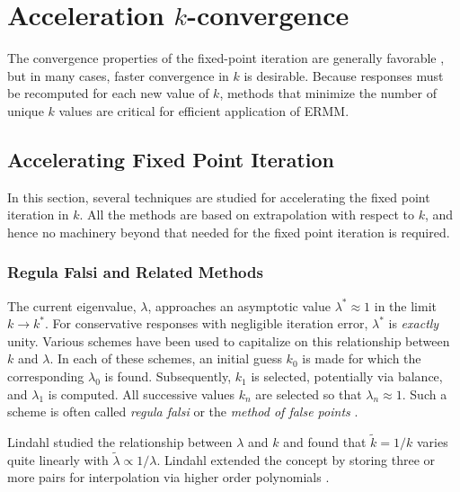 \section{Acceleration $k$-convergence}
\label{sec:outer}

The convergence properties of the fixed-point iteration
are generally favorable \cite{roberts2014cer}, but in many cases,
faster convergence in $k$ is desirable.  Because responses 
must be recomputed for each new value of $k$,  methods that 
minimize the number of unique $k$ values are critical for 
efficient application of ERMM.

\subsection{Accelerating Fixed Point Iteration}

In this section, several techniques are studied for 
accelerating the fixed point iteration in $k$.  All 
the methods are based on extrapolation with respect to 
$k$, and hence no machinery beyond that needed for the 
fixed point iteration is required.

\subsubsection{Regula Falsi and Related Methods}
\label{sec:extrapolationmethods}

The current eigenvalue, $\lambda$, approaches an 
asymptotic value $\lambda^* \approx 1$ in the 
limit $k\to k^*$.  For conservative responses with negligible 
iteration error, $\lambda^*$ is {\it exactly} unity.  
Various 
schemes have been used to capitalize on this relationship between 
$k$ and $\lambda$.  In each of these
schemes, an initial guess $k_0$ is made for which the corresponding 
$\lambda_0$ is found.  Subsequently, $k_1$ is selected, potentially via 
balance, and $\lambda_1$ is computed.  All successive values $k_n$  
are selected so that $\lambda_n \approx 1$.  Such a scheme is often
called {\it regula falsi} or the {\it method of false points} 
\cite{lindahl1976mdr}.

Lindahl studied the relationship between $\lambda$ and $k$ and found that 
$\tilde{k} = 1/k$ varies quite 
linearly with $\tilde{\lambda} \propto 1/\lambda$.
Lindahl extended the concept by storing three or more pairs for interpolation
via higher order polynomials \cite{lindahl1976mdr}.

